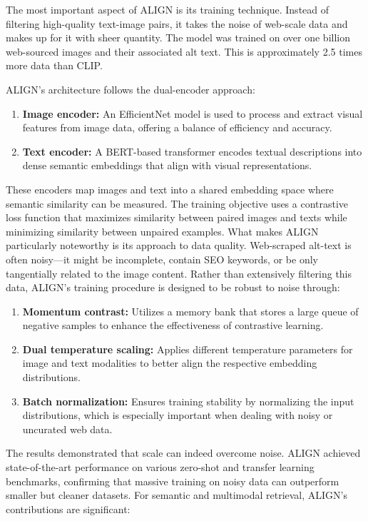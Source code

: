 \documentclass[conference]{IEEEtran}
\begin{document}
\begin{enumerate}
The most important aspect of ALIGN is its training technique. Instead of filtering high-quality text-image pairs, it takes the noise of web-scale data and makes up for it with sheer quantity. The model was trained on over one billion web-sourced images and their associated alt text. This is approximately 2.5 times more data than CLIP.

ALIGN's architecture follows the dual-encoder approach:
\begin{enumerate}
    \item \textbf{Image encoder:} An EfficientNet model is used to process and extract visual features from image data, offering a balance of efficiency and accuracy.
    
    \item \textbf{Text encoder:} A BERT-based transformer encodes textual descriptions into dense semantic embeddings that align with visual representations.
\end{enumerate}

These encoders map images and text into a shared embedding space where semantic similarity can be measured. The training objective uses a contrastive loss function that maximizes similarity between paired images and texts while minimizing similarity between unpaired examples.
What makes ALIGN particularly noteworthy is its approach to data quality. Web-scraped alt-text is often noisy—it might be incomplete, contain SEO keywords, or be only tangentially related to the image content. Rather than extensively filtering this data, ALIGN's training procedure is designed to be robust to noise through:

\begin{enumerate}
    \item \textbf{Momentum contrast:} Utilizes a memory bank that stores a large queue of negative samples to enhance the effectiveness of contrastive learning.
    
    \item \textbf{Dual temperature scaling:} Applies different temperature parameters for image and text modalities to better align the respective embedding distributions.
    
    \item \textbf{Batch normalization:} Ensures training stability by normalizing the input distributions, which is especially important when dealing with noisy or uncurated web data.
\end{enumerate}

The results demonstrated that scale can indeed overcome noise. ALIGN achieved state-of-the-art performance on various zero-shot and transfer learning benchmarks, confirming that massive training on noisy data can outperform smaller but cleaner datasets.
For semantic and multimodal retrieval, ALIGN's contributions are significant:


\end{enumerate}
\end{document}
